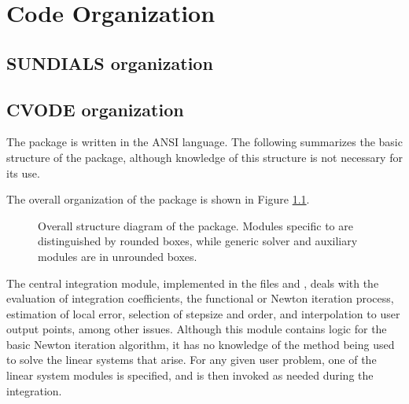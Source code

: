 \chapter{Code Organization}\label{s:organization}

\section{SUNDIALS organization}\label{ss:sun_org}


\section{CVODE organization}\label{ss:cvode_org}

The {\cvode} package is written in the ANSI {\C} language. The following
summarizes the basic structure of the package, although knowledge
of this structure is not necessary for its use.

The overall organization of the {\cvode} package is shown in Figure
\ref{f:cvorg}. 
\begin{figure}
{\centerline{}}
\caption [Overall structure diagram of the {\cvode} package]
{Overall structure diagram of the {\cvode} package.
  Modules specific to {\cvode} are distinguished by rounded boxes, while 
  generic solver and auxiliary modules are in unrounded boxes.}
\label{f:cvorg}
\end{figure}

The central integration module, implemented in the files 
 and , deals with the evaluation of integration coefficients,
the functional or Newton iteration process, estimation of local error,
selection of stepsize and order, and interpolation to user output
points, among other issues.  Although this module contains logic for
the basic Newton iteration algorithm, it has no knowledge of the
method being used to solve the linear systems that arise.  For any
given user problem, one of the linear system modules is specified, and
is then invoked as needed during the integration. 

